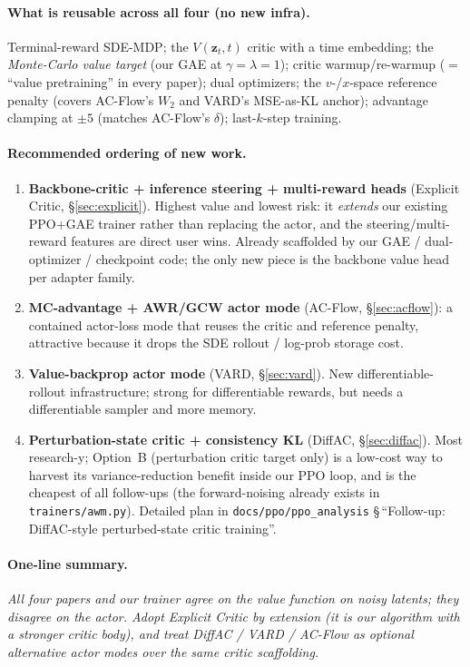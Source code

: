 \documentclass[11pt]{article}
\theoremstyle{remark}
\newcommand{\zt}{\bm{z}}
\begin{document}
\paragraph{What is reusable across all four (no new infra).}
Terminal-reward SDE-MDP; the $V(\zt_t,t)$ critic with a time embedding; the
\emph{Monte-Carlo value target} (our GAE at $\gamma{=}\lambda{=}1$); critic
warmup/re-warmup ($=$ ``value pretraining'' in every paper); dual optimizers; the
$v$-/$x$-space reference penalty (covers AC-Flow's $W_2$ and VARD's MSE-as-KL anchor);
advantage clamping at $\pm 5$ (matches AC-Flow's $\delta$); last-$k$-step training.

\paragraph{Recommended ordering of new work.}
\begin{enumerate}[leftmargin=1.6em]
  \item \textbf{Backbone-critic + inference steering + multi-reward heads}
  (Explicit Critic, \S\ref{sec:explicit}). Highest value and lowest risk: it
  \emph{extends} our existing PPO+GAE trainer rather than replacing the actor, and the
  steering/multi-reward features are direct user wins. Already scaffolded by our GAE /
  dual-optimizer / checkpoint code; the only new piece is the backbone value head per
  adapter family.
  \item \textbf{MC-advantage + AWR/GCW actor mode} (AC-Flow, \S\ref{sec:acflow}): a
  contained actor-loss mode that reuses the critic and reference penalty, attractive
  because it drops the SDE rollout / log-prob storage cost.
  \item \textbf{Value-backprop actor mode} (VARD, \S\ref{sec:vard}). New
  differentiable-rollout infrastructure; strong for differentiable rewards, but needs a
  differentiable sampler and more memory.
  \item \textbf{Perturbation-state critic + consistency KL} (DiffAC, \S\ref{sec:diffac}).
  Most research-y; Option~B (perturbation critic target only) is a low-cost way to
  harvest its variance-reduction benefit inside our PPO loop, and is the cheapest of all
  follow-ups (the forward-noising already exists in \texttt{trainers/awm.py}). Detailed
  plan in \texttt{docs/ppo/ppo\_analysis} \S\,``Follow-up: DiffAC-style perturbed-state
  critic training''.
\end{enumerate}

\paragraph{One-line summary.}
\emph{All four papers and our trainer agree on the value function on noisy latents; they
disagree on the actor. Adopt Explicit Critic by extension (it is our algorithm with a
stronger critic body), and treat DiffAC / VARD / AC-Flow as optional alternative actor
modes over the same critic scaffolding.}
\end{document}
